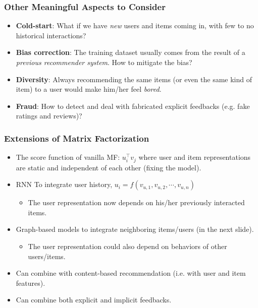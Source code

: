 \documentclass[11pt]{beamer}
\begin{document}
	\begin{frame}
		\frametitle{Other Meaningful Aspects to Consider}
		\begin{itemize}
			\item \textbf{Cold-start}: What if we have \textit{new} users and items coming in, with few to no historical interactions? \pause
			\item \textbf{Bias correction}: The training dataset usually comes from the result of a \textit{previous recommender system}.  How to mitigate the bias? \pause
			\item \textbf{Diversity}: Always recommending the same items (or even the same kind of item) to a user would make him/her feel \textit{bored}. \pause
			\item \textbf{Fraud}: How to detect and deal with fabricated explicit feedbacks (e.g. fake ratings and reviews)?
		\end{itemize}
	\end{frame}

	\begin{frame}
		\frametitle{Extensions of Matrix Factorization}
		\begin{itemize}
			\item The score function of vanilla MF: $u_i^\top v_j$ where user and item representations are static and independent of each other (fixing the model).
			\item RNN To integrate user history, $u_i = f(v_{u, 1}, v_{u, 2}, \cdots, v_{u, n})$
			\begin{itemize}
				\item The user representation now depends on his/her previously interacted items.
			\end{itemize}
			\item Graph-based models to integrate neighboring items/users (in the next slide).
			\begin{itemize}
				\item The user representation could also depend on behaviors of other users/items.
			\end{itemize}
			\item Can combine with content-based recommendation (i.e. with user and item features).
			\item Can combine both explicit and implicit feedbacks.
		\end{itemize}
	\end{frame}
\end{document}
